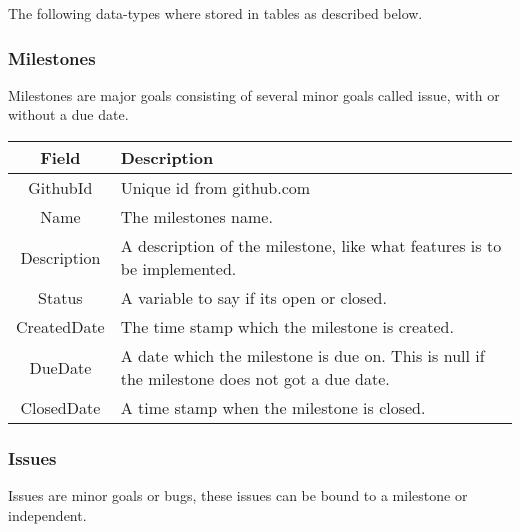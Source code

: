 The following data-types where stored in tables as described below.

\subsubsection*{Milestones}
Milestones are major goals consisting of several minor goals called issue, with or without a due date. \\

\vspace{0.5cm}
\begin{tabularx}{\linewidth}{| c | X |}
    \hline
    \rowcolor[gray]{0.8}
    \textbf{Field} & \textbf{Description} \\
    \hline
    GithubId & Unique id from github.com\\ \hline
    Name & The milestones name.\\ \hline
   	Description & A description of the milestone, like what features is to be implemented.\\ \hline
    Status & A variable to say if its open or closed.\\ \hline
    CreatedDate & The time stamp which the milestone is created.\\ \hline
    DueDate & A date which the milestone is due on. This is null if the milestone does not got a due date.\\ \hline
    ClosedDate & A time stamp when the milestone is closed.\\ 
    \hline
\end{tabularx}
\vspace{0.5cm}

\subsubsection*{Issues}
Issues are minor goals or bugs, these issues can be bound to a milestone or independent. \\

